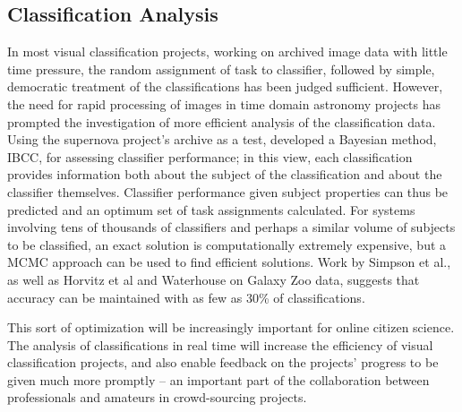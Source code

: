 \documentclass{ar2e}
\begin{document}



\subsection{Classification Analysis}
\label{sec:class:analysis}

In most visual classification projects, working on archived image data with
little time pressure, the random assignment of task to classifier, followed by
simple, democratic treatment of the classifications has been judged sufficient.
However, the need for rapid processing of images in time domain astronomy
projects has prompted the investigation of more efficient analysis of the
classification data.  Using the supernova project's archive as a test,
\citet{SimpsonEtalIBCC} developed a Bayesian method, IBCC, for assessing
classifier performance; in this view, each classification provides information
both about the subject of the classification and about the classifier
themselves. Classifier performance given subject properties can thus be
predicted and an optimum set of task assignments calculated. For systems
involving tens of thousands of classifiers and perhaps a similar volume of
subjects to be classified, an exact solution is computationally extremely
expensive, but a MCMC approach can be used to find efficient solutions. Work by
Simpson et al., as well as Horvitz et al and Waterhouse on Galaxy Zoo data,
suggests that accuracy can be maintained with as few as 30\% of
classifications. 

This sort of optimization will be increasingly important for online citizen
science. The  analysis of classifications in real time will increase the
efficiency of visual classification projects, and also enable feedback on the
projects' progress to be given much more promptly -- an important part of
the collaboration between professionals and amateurs in crowd-sourcing projects.
\end{document}
